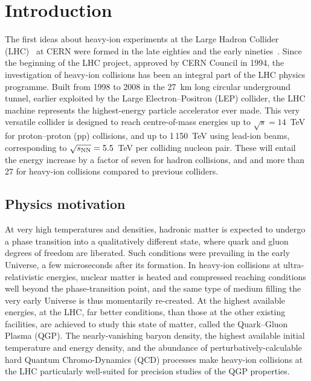 \section{Introduction}
\label{secall:intro}
The first ideas about heavy-ion experiments at the Large Hadron Collider (LHC)~\cite{Evans:2008zzb} at CERN were formed in the late eighties and the early nineties~\cite{Jarlskog:1990dv}. Since the beginning of the LHC project, approved by CERN Council in 1994, the investigation of heavy-ion collisions has been an integral part of the LHC physics programme. Built from 1998 to 2008 in the 27~km long circular underground tunnel, earlier exploited by the Large Electron--Positron (LEP) collider, the LHC machine represents the highest-energy particle accelerator ever made. This very versatile collider is designed to reach centre-of-mass energies up to $\sqrt{s} = 14$~TeV for proton--proton (pp) collisions, and up to 1\,150~TeV using lead-ion beams, corresponding to $\sqrt{s_{\rm NN}} = 5.5$~TeV per colliding nucleon pair. These will entail the energy increase by a factor of seven for hadron collisions, and and more than 27 for heavy-ion collisions compared to previous colliders.
\subsection{Physics motivation}
\label{subsecall:motivation}
At very high temperatures and densities, hadronic matter is expected to undergo a phase transition into a qualitatively different state, where quark and gluon degrees of freedom are liberated. Such conditions were prevailing in the early Universe, a few microseconds after its formation. In heavy-ion collisions at ultra-relativistic energies, nuclear matter is heated and compressed reaching conditions well beyond the phase-transition point, and the same type of medium filling the very early Universe is thus momentarily re-created. At the highest available energies, at the LHC, far better conditions, than those at the other existing facilities, are achieved to study this state of matter, called the Quark--Gluon Plasma (QGP). The nearly-vanishing baryon density, the highest available initial temperature and energy density, and the abundance of perturbatively-calculable hard Quantum Chromo-Dynamics (QCD) processes make heavy-ion collisions at the LHC particularly well-suited for precision studies of the QGP properties.

